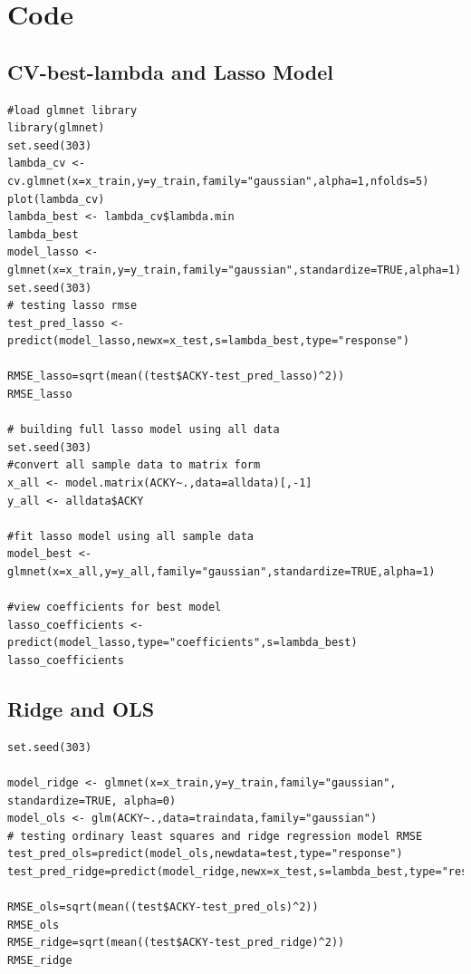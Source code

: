 \documentclass[a4paper,12pt]{article}
\begin{document}
\newpage
\appendix

\section{Code}
\subsection{CV-best-lambda and Lasso Model}
\begin{lstlisting}
#load glmnet library
library(glmnet)
set.seed(303)
lambda_cv <- cv.glmnet(x=x_train,y=y_train,family="gaussian",alpha=1,nfolds=5)
plot(lambda_cv)
lambda_best <- lambda_cv$lambda.min
lambda_best
model_lasso <- glmnet(x=x_train,y=y_train,family="gaussian",standardize=TRUE,alpha=1)
set.seed(303)
# testing lasso rmse
test_pred_lasso <- predict(model_lasso,newx=x_test,s=lambda_best,type="response")

RMSE_lasso=sqrt(mean((test$ACKY-test_pred_lasso)^2))
RMSE_lasso

# building full lasso model using all data
set.seed(303)
#convert all sample data to matrix form
x_all <- model.matrix(ACKY~.,data=alldata)[,-1]
y_all <- alldata$ACKY

#fit lasso model using all sample data
model_best <- glmnet(x=x_all,y=y_all,family="gaussian",standardize=TRUE,alpha=1)

#view coefficients for best model
lasso_coefficients <- predict(model_lasso,type="coefficients",s=lambda_best)
lasso_coefficients
\end{lstlisting}

\subsection{Ridge and OLS}
\begin{lstlisting}
set.seed(303)

model_ridge <- glmnet(x=x_train,y=y_train,family="gaussian", standardize=TRUE, alpha=0)
model_ols <- glm(ACKY~.,data=traindata,family="gaussian")
# testing ordinary least squares and ridge regression model RMSE
test_pred_ols=predict(model_ols,newdata=test,type="response")
test_pred_ridge=predict(model_ridge,newx=x_test,s=lambda_best,type="response")

RMSE_ols=sqrt(mean((test$ACKY-test_pred_ols)^2))
RMSE_ols
RMSE_ridge=sqrt(mean((test$ACKY-test_pred_ridge)^2))
RMSE_ridge
\end{lstlisting}
\end{document}
